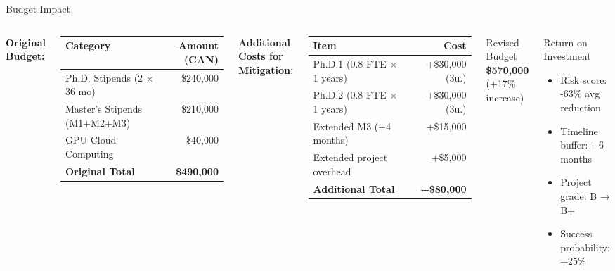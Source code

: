 \documentclass[aspectratio=169]{beamer}
\begin{document}
\begin{frame}{Budget Impact}

\begin{columns}[T]

\vspace{-0.4cm}
\textbf{Original Budget:}
\scriptsize
\begin{tabular}{|l|r|}
\hline
\rowcolor{primary!20}
\textbf{Category} & \textbf{Amount (CAN)} \\
\hline
Ph.D. Stipends (2 × 36 mo) & \$240,000 \\
\hline
Master's Stipends (M1+M2+M3) & \$210,000 \\
\hline
GPU Cloud Computing & \$40,000 \\
\hline
\rowcolor{primary!10}
\textbf{Original Total} & \textbf{\$490,000} \\
\hline
\end{tabular}

\vspace{0.2cm}
\textbf{Additional Costs for Mitigation:}
\scriptsize
\begin{tabular}{|l|r|}
\hline
\rowcolor{secondary!20}
\textbf{Item} & \textbf{Cost} \\
\hline
Ph.D.1 (0.8 FTE × 1 years) & +\$30,000 (3u.) \\
\hline
Ph.D.2 (0.8 FTE × 1 years) & +\$30,000 (3u.)\\
\hline
Extended M3 (+4 months) & +\$15,000 \\
\hline
Extended project overhead & +\$5,000 \\
\hline
\rowcolor{secondary!10}
\textbf{Additional Total} & \textbf{+\$80,000} \\
\hline
\end{tabular}


\vspace{-0.8cm}
\begin{block}{Revised Budget}
\centering
\Large\textbf{\$570,000}\\
\normalsize (+17\% increase)
\end{block}

\vspace{-0.2cm}
\begin{alertblock}{Return on Investment}
\scriptsize
\begin{itemize}
    \item Risk score: -63\% avg reduction
    \item Timeline buffer: +6 months
    \item Project grade: B → B+
    \item Success probability: +25\%
\end{itemize}
\end{alertblock}




\end{columns}
\end{frame}
\end{document}
